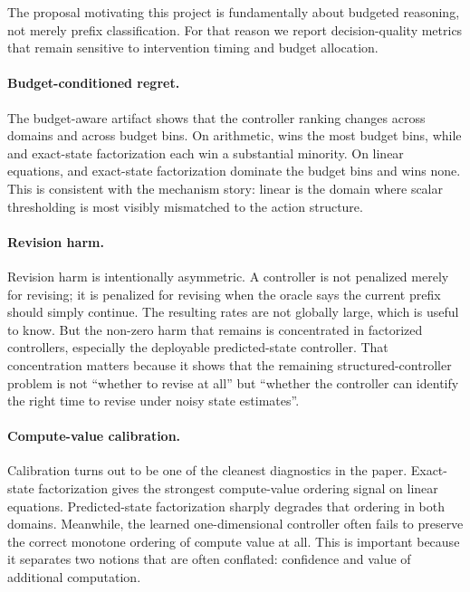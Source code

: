 The proposal motivating this project is fundamentally about budgeted reasoning, not merely prefix classification.
For that reason we report decision-quality metrics that remain sensitive to intervention timing and budget allocation.

\paragraph{Budget-conditioned regret.}
The budget-aware artifact shows that the controller ranking changes across domains and across budget bins.
On arithmetic, \directpolicy wins the most budget bins, while \orderedscalar and exact-state factorization each win a substantial minority.
On linear equations, \directpolicy and exact-state factorization dominate the budget bins and \orderedscalar wins none.
This is consistent with the mechanism story:
linear is the domain where scalar thresholding is most visibly mismatched to the action structure.

\paragraph{Revision harm.}
Revision harm is intentionally asymmetric.
A controller is not penalized merely for revising; it is penalized for revising when the oracle says the current prefix should simply continue.
The resulting rates are not globally large, which is useful to know.
But the non-zero harm that remains is concentrated in factorized controllers, especially the deployable predicted-state controller.
That concentration matters because it shows that the remaining structured-controller problem is not ``whether to revise at all'' but ``whether the controller can identify the right time to revise under noisy state estimates''.

\paragraph{Compute-value calibration.}
Calibration turns out to be one of the cleanest diagnostics in the paper.
Exact-state factorization gives the strongest compute-value ordering signal on linear equations.
Predicted-state factorization sharply degrades that ordering in both domains.
Meanwhile, the learned one-dimensional controller often fails to preserve the correct monotone ordering of compute value at all.
This is important because it separates two notions that are often conflated: confidence and value of additional computation.

